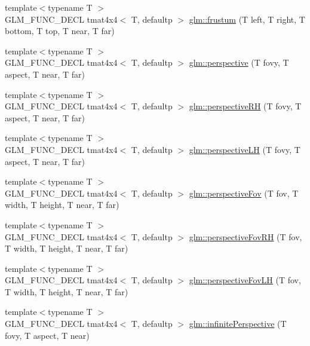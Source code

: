 \begin{DoxyCompactItemize}
{\footnotesize template$<$typename T $>$ }\\G\+L\+M\+\_\+\+F\+U\+N\+C\+\_\+\+D\+E\+C\+L tmat4x4$<$ T, defaultp $>$ \hyperlink{group__gtc__matrix__transform_gada6deb989d4b553fe0f7e3279f3afae1}{glm\+::frustum} (T left, T right, T bottom, T top, T near, T far)
\item 
{\footnotesize template$<$typename T $>$ }\\G\+L\+M\+\_\+\+F\+U\+N\+C\+\_\+\+D\+E\+C\+L tmat4x4$<$ T, defaultp $>$ \hyperlink{group__gtc__matrix__transform_gac3613dcb6c6916465ad5b7ad5a786175}{glm\+::perspective} (T fovy, T aspect, T near, T far)
\item 
{\footnotesize template$<$typename T $>$ }\\G\+L\+M\+\_\+\+F\+U\+N\+C\+\_\+\+D\+E\+C\+L tmat4x4$<$ T, defaultp $>$ \hyperlink{group__gtc__matrix__transform_ga5a4fa9f8ffabb2294e48a18bf8fa2f5f}{glm\+::perspective\+R\+H} (T fovy, T aspect, T near, T far)
\item 
{\footnotesize template$<$typename T $>$ }\\G\+L\+M\+\_\+\+F\+U\+N\+C\+\_\+\+D\+E\+C\+L tmat4x4$<$ T, defaultp $>$ \hyperlink{group__gtc__matrix__transform_ga34048da27c559f1ac8e9550d169dd6f3}{glm\+::perspective\+L\+H} (T fovy, T aspect, T near, T far)
\item 
{\footnotesize template$<$typename T $>$ }\\G\+L\+M\+\_\+\+F\+U\+N\+C\+\_\+\+D\+E\+C\+L tmat4x4$<$ T, defaultp $>$ \hyperlink{group__gtc__matrix__transform_gae9146e2c550fc8646299e4b900238145}{glm\+::perspective\+Fov} (T fov, T width, T height, T near, T far)
\item 
{\footnotesize template$<$typename T $>$ }\\G\+L\+M\+\_\+\+F\+U\+N\+C\+\_\+\+D\+E\+C\+L tmat4x4$<$ T, defaultp $>$ \hyperlink{group__gtc__matrix__transform_ga07cd8df791bf90dcb782645fe0b21261}{glm\+::perspective\+Fov\+R\+H} (T fov, T width, T height, T near, T far)
\item 
{\footnotesize template$<$typename T $>$ }\\G\+L\+M\+\_\+\+F\+U\+N\+C\+\_\+\+D\+E\+C\+L tmat4x4$<$ T, defaultp $>$ \hyperlink{group__gtc__matrix__transform_gae705a2f19c3ef5ef880bd6c92759cf2d}{glm\+::perspective\+Fov\+L\+H} (T fov, T width, T height, T near, T far)
\item 
{\footnotesize template$<$typename T $>$ }\\G\+L\+M\+\_\+\+F\+U\+N\+C\+\_\+\+D\+E\+C\+L tmat4x4$<$ T, defaultp $>$ \hyperlink{group__gtc__matrix__transform_ga79f704ad91a5f0d68abd88c66c8186e5}{glm\+::infinite\+Perspective} (T fovy, T aspect, T near)

\end{DoxyCompactItemize}
